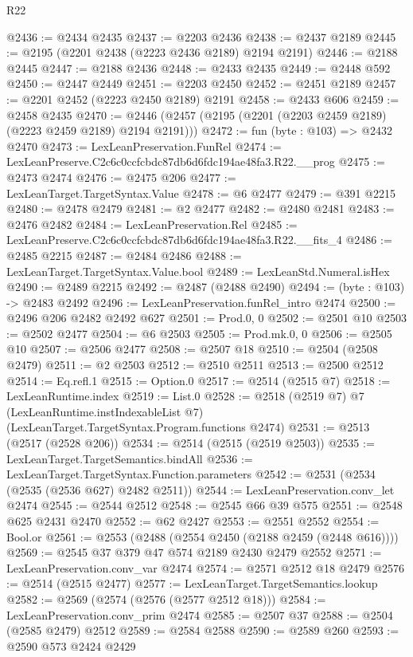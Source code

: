 \begin{lexlean}{R22}
\begin{coremodule}
@2436 := @2434 @2435
@2437 := @2203 @2436
@2438 := @2437 @2189
@2445 := @2195 (@2201 @2438 (@2223 @2436 @2189) @2194 @2191)
@2446 := @2188 @2445
@2447 := @2188 @2436
@2448 := @2433 @2435
@2449 := @2448 @592
@2450 := @2447 @2449
@2451 := @2203 @2450
@2452 := @2451 @2189
@2457 := @2201 @2452 (@2223 @2450 @2189) @2191
@2458 := @2433 @606
@2459 := @2458 @2435
@2470 := @2446 (@2457 (@2195 (@2201 (@2203 @2459 @2189) (@2223 @2459 @2189) @2194 @2191)))
@2472 := fun (byte : @103) => @2432 @2470
@2473 := LexLeanPreservation.FunRel
@2474 := LexLeanPreserve.C2c6c0ccfcbdc87db6d6fdc194ae48fa3.R22.__prog
@2475 := @2473 @2474
@2476 := @2475 @206
@2477 := LexLeanTarget.TargetSyntax.Value
@2478 := @6 @2477
@2479 := @391 @2215
@2480 := @2478 @2479
@2481 := @2 @2477
@2482 := @2480 @2481
@2483 := @2476 @2482
@2484 := LexLeanPreservation.Rel
@2485 := LexLeanPreserve.C2c6c0ccfcbdc87db6d6fdc194ae48fa3.R22.__fits_4
@2486 := @2485 @2215
@2487 := @2484 @2486
@2488 := LexLeanTarget.TargetSyntax.Value.bool
@2489 := LexLeanStd.Numeral.isHex
@2490 := @2489 @2215
@2492 := @2487 (@2488 @2490)
@2494 := (byte : @103) -> @2483 @2492
@2496 := LexLeanPreservation.funRel_intro @2474
@2500 := @2496 @206 @2482 @2492 @627
@2501 := Prod.{0, 0}
@2502 := @2501 @10
@2503 := @2502 @2477
@2504 := @6 @2503
@2505 := Prod.mk.{0, 0}
@2506 := @2505 @10
@2507 := @2506 @2477
@2508 := @2507 @18
@2510 := @2504 (@2508 @2479)
@2511 := @2 @2503
@2512 := @2510 @2511
@2513 := @2500 @2512
@2514 := Eq.refl.{1}
@2515 := Option.{0}
@2517 := @2514 (@2515 @7)
@2518 := LexLeanRuntime.index
@2519 := List.{0}
@2528 := @2518
    (@2519 @7)
    @7
    (LexLeanRuntime.instIndexableList @7)
    (LexLeanTarget.TargetSyntax.Program.functions @2474)
@2531 := @2513 (@2517 (@2528 @206))
@2534 := @2514 (@2515 (@2519 @2503))
@2535 := LexLeanTarget.TargetSemantics.bindAll
@2536 := LexLeanTarget.TargetSyntax.Function.parameters
@2542 := @2531 (@2534 (@2535 (@2536 @627) @2482 @2511))
@2544 := LexLeanPreservation.conv_let @2474
@2545 := @2544 @2512
@2548 := @2545 @66 @39 @575
@2551 := @2548 @625 @2431 @2470
@2552 := @62 @2427
@2553 := @2551 @2552
@2554 := Bool.or
@2561 := @2553 (@2488 (@2554 @2450 (@2188 @2459 (@2448 @616))))
@2569 := @2545 @37 @379 @47 @574 @2189 @2430 @2479 @2552
@2571 := LexLeanPreservation.conv_var @2474
@2574 := @2571 @2512 @18 @2479
@2576 := @2514 (@2515 @2477)
@2577 := LexLeanTarget.TargetSemantics.lookup
@2582 := @2569 (@2574 (@2576 (@2577 @2512 @18)))
@2584 := LexLeanPreservation.conv_prim @2474
@2585 := @2507 @37
@2588 := @2504 (@2585 @2479) @2512
@2589 := @2584 @2588
@2590 := @2589 @260
@2593 := @2590 @573 @2424 @2429

\end{coremodule}
\end{lexlean}
